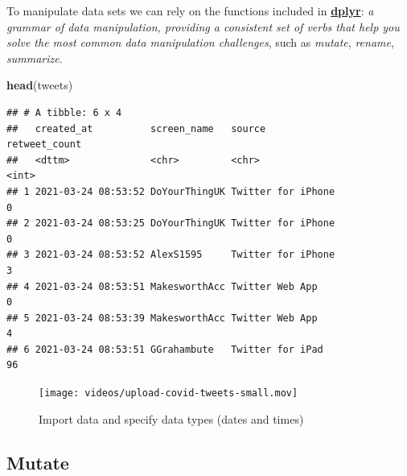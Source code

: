 \documentclass[
]{article}
\newenvironment{Shaded}{\begin{snugshade}}{\end{snugshade}}
\newcommand{\DataTypeTok}[1]{\textcolor[rgb]{0.13,0.29,0.53}{#1}}
\newcommand{\KeywordTok}[1]{\textcolor[rgb]{0.13,0.29,0.53}{\textbf{#1}}}
\newcommand{\NormalTok}[1]{#1}
\newcommand{\StringTok}[1]{\textcolor[rgb]{0.31,0.60,0.02}{#1}}
\begin{document}
To manipulate data sets we can rely on the functions included in \href{https://dplyr.tidyverse.org}{\textbf{dplyr}}: \emph{a grammar of data manipulation, providing a consistent set of verbs that help you solve the most common data manipulation challenges}, such as \emph{mutate}, \emph{rename}, \emph{summarize}.

\begin{Shaded}
\end{Shaded}

\begin{Shaded}
\begin{Highlighting}[]
\KeywordTok{head}\NormalTok{(tweets)}
\end{Highlighting}
\end{Shaded}

\begin{verbatim}
## # A tibble: 6 x 4
##   created_at          screen_name   source             retweet_count
##   <dttm>              <chr>         <chr>                      <int>
## 1 2021-03-24 08:53:52 DoYourThingUK Twitter for iPhone             0
## 2 2021-03-24 08:53:25 DoYourThingUK Twitter for iPhone             0
## 3 2021-03-24 08:53:52 AlexS1595     Twitter for iPhone             3
## 4 2021-03-24 08:53:51 MakesworthAcc Twitter Web App                0
## 5 2021-03-24 08:53:39 MakesworthAcc Twitter Web App                4
## 6 2021-03-24 08:53:51 GGrahambute   Twitter for iPad              96
\end{verbatim}

\begin{figure}
\centering
\texttt{[image: videos/upload-covid-tweets-small.mov]}
\caption{Import data and specify data types (dates and times)}
\end{figure}

\hypertarget{mutate}{%
\subsection{Mutate}\label{mutate}}
\end{document}

